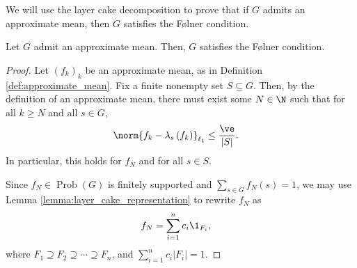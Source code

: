 \documentclass[10pt]{mypackage2}
\begin{document}
We will use the layer cake decomposition to prove that if $G$ admits an approximate mean, then $G$ satisfies the Følner condition.
\begin{proposition}\label{prop:approx_mean_implies_folner}
  Let $G$ admit an approximate mean. Then, $G$ satisfies the Følner condition.
\end{proposition}
\begin{proof}
  Let $\left(f_k\right)_k$ be an approximate mean, as in Definition \ref{def:approximate_mean}. Fix a finite nonempty set $S \subseteq G$. Then, by the definition of an approximate mean, there must exist some $N\in\N$ such that for all $k\geq N$ and all $s\in G$,
  \begin{align*}
    \norm{f_k - \lambda_s\left(f_k\right)}_{\ell_1} &\leq \frac{\ve}{|S|}.
  \end{align*}
  In particular, this holds for $f_N$ and for all $s\in S$.\newline

  Since $f_N\in \operatorname{Prob}(G)$ is finitely supported and $\sum_{s\in G}f_N(s) = 1$, we may use Lemma \ref{lemma:layer_cake_representation} to rewrite $f_N$ as
  \begin{align*}
    f_N &= \sum_{i=1}^{n}c_i\1_{F_i},
  \end{align*}
  where $F_1 \supseteq F_2\supseteq \cdots \supseteq F_n$, and $\sum_{i=1}^{n}c_i\left\vert F_i \right\vert = 1$.\newline


\end{proof}
\end{document}
